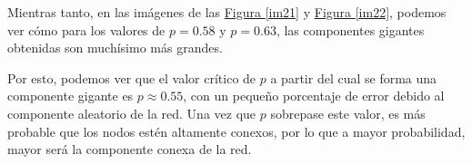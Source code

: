 \documentclass[paper=a4, fontsize=11pt]{article} %
\numberwithin{equation}{section} %
\numberwithin{figure}{section} %
\numberwithin{table}{section} %
\begin{document}
Mientras tanto, en las imágenes de las \hyperref[im21]{Figura \ref{im21}} y \hyperref[im22]{Figura \ref{im22}}, podemos ver cómo para los valores de $p = 0.58$ y $p=0.63$, las componentes gigantes obtenidas son muchísimo más grandes.

Por esto, podemos ver que el valor crítico de $p$ a partir del cual se forma una componente gigante es $p\approx0.55$, con un pequeño porcentaje de error debido al componente aleatorio de la red. Una vez que $p$ sobrepase este valor, es más probable que los nodos estén altamente conexos, por lo que a mayor probabilidad, mayor será la componente conexa de la red.
\end{document}
